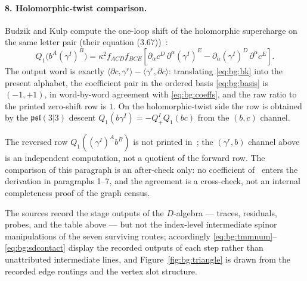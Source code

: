 \paragraph{8. Holomorphic-twist comparison.} Budzik and Kulp compute the one-loop shift of the holomorphic supercharge
on the same letter pair (their equation (3.67))~\cite{BK}:
\begin{equation}\label{eq:bg:bk}
Q_{1}\big(b^{A}(\gamma^{I})^{B}\big) =\kappa^{2}f_{ACD}f_{BCE}\left[ \partial_{\dot\alpha}c^{D}\,\partial^{\dot\alpha}(\gamma^{I})^{E} -\partial_{\dot\alpha}(\gamma^{I})^{D}\,\partial^{\dot\alpha}c^{E}\right] .
\end{equation}
The output word is exactly $\langle\partial c,\gamma^{r}\rangle-\langle\gamma^{r},\partial c\rangle$: translating
\eqref{eq:bg:bk} into the present alphabet, the coefficient pair in the ordered basis \eqref{eq:bg:basis} is $(-1,+1)$,
in word-by-word agreement with \eqref{eq:bg:coeffs}, and the raw ratio to the printed zero-shift row is $1$. On the
holomorphic-twist side the row is obtained by the $\mathfrak{psl}(3|3)$ descent
$Q_{1}(b\gamma^{I})=-Q_{+}^{I}Q_{1}(bc)$ from the $(b,c)$ channel.

\begin{remark}\label{rem:bg:ht}
The reversed row $Q_{1}((\gamma^{I})^{A}b^{B})$ is not printed in~\cite{BK}; the $(\gamma^{r},b)$ channel above is
an independent computation, not a quotient of the forward row. The comparison of this paragraph is an after-check
only: no coefficient of~\cite{BK} enters the derivation in paragraphs 1--7, and the agreement is a cross-check, not
an internal completeness proof of the graph census.
\end{remark}

\begin{remark}\label{rem:bg:gaps}
The sources record the stage outputs of the $D$-algebra --- traces, residuals, probes, and the table above --- but
not the index-level intermediate spinor manipulations of the seven surviving routes; accordingly
\eqref{eq:bg:tmmnum}--\eqref{eq:bg:sdcontact} display the recorded outputs of each step rather than unattributed
intermediate lines, and Figure~\ref{fig:bg:triangle} is drawn from the recorded edge routings and the vertex
slot structure.
\end{remark}

